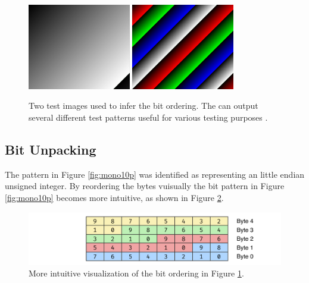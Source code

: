 \begin{figure}
    \centering
    \includegraphics[width=0.4\textwidth]{figures/unpacking/test_pattern0.jpg}
    \includegraphics[width=0.4\textwidth]{figures/unpacking/test_pattern2.jpg}
    \caption{Two test images used to infer the bit ordering.
        The \cam can output several different test patterns useful for various testing purposes \cite{lucidvisionlabsTritonMPPolarized2020}.}
    \label{fig:test_pattern}
\end{figure}


\subsection{Bit Unpacking}
The pattern in Figure \ref{fig:mono10p} was identified as representing an little endian unsigned integer.
By reordering the bytes vuisually the bit pattern in Figure \ref{fig:mono10p} becomes more intuitive, as shown in Figure \ref{fig:mono10p_reordered}.

\begin{figure}
    \centering
    \includegraphics[width=\textwidth]{figures/unpacking/layout_10p_be.pdf}
    \caption{More intuitive visualization of the bit ordering in Figure \ref{fig:test_pattern}.}
    \label{fig:mono10p_reordered}
\end{figure}

